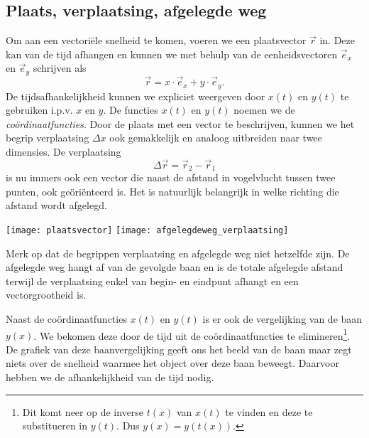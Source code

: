 \documentclass{ximera}
\begin{document}
	\author{Bart Lambregs}
    \xmsource





	\subsection{Plaats, verplaatsing, afgelegde weg}
	
	Om aan een vectori\"ele snelheid te komen, voeren we een plaatsvector $\vec{r}$ in. Deze kan van de tijd afhangen en kunnen we met behulp van de eenheidsvectoren $\vec{e}_x$ en $\vec{e}_y$ schrijven als
	\begin{equation*}
	 \vec{r}=x\cdot\vec{e}_x+y\cdot\vec{e}_y.
	\end{equation*}
	De tijdsafhankelijkheid kunnen we expliciet weergeven door $x(t)$ en $y(t)$ te gebruiken i.p.v. $x$ en $y$. De functies $x(t)$ en $y(t)$ noemen we de \emph{co\"ordinaat\-functies}. Door de plaats met een vector te beschrijven, kunnen we het begrip verplaatsing $\Delta x$ ook gemakkelijk en analoog uitbreiden naar twee dimensies. De verplaatsing
	\begin{equation*}
	\Delta\vec{r}=\vec{r}_2-\vec{r}_1
	\end{equation*}
	is nu immers ook een vector die naast de afstand in vogelvlucht tussen twee punten, ook ge\"ori\"enteerd is. Het is natuurlijk belangrijk in welke richting die afstand wordt afgelegd.
	\begin{image}
	
	\texttt{[image: plaatsvector]}
	\texttt{[image: afgelegdeweg\_verplaatsing]}
	\end{image}
	Merk op dat de begrippen verplaatsing en afgelegde weg niet hetzelfde zijn. De afgelegde weg hangt af van de gevolgde baan en is de totale afgelegde afstand terwijl de verplaatsing enkel van begin- en eindpunt afhangt en een vectorgrootheid is.
	
	Naast de co\"ordinaatfuncties $x(t)$ en $y(t)$ is er ook de vergelijking van de baan $y(x)$. We bekomen deze door de tijd uit de co\"ordinaatfuncties te elimineren\footnote{Dit komt neer op de inverse $t(x)$ van $x(t)$ te vinden en deze te substitueren in $y(t)$. Dus $y(x)=y(t(x))$.}. De grafiek van deze baanvergelijking geeft ons het beeld van de baan maar zegt niets over de snelheid waarmee het object over deze baan beweegt. Daarvoor hebben we de afhankelijkheid van de tijd nodig.
	
\end{document}
